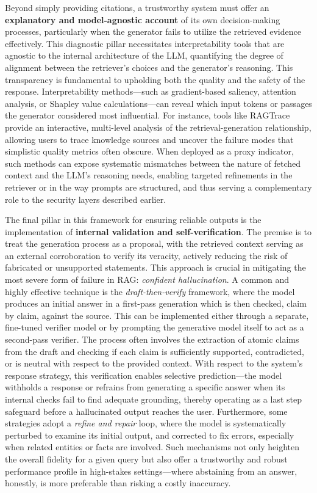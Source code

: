 \documentclass[11pt,a4paper]{article}
\begin{document}
Beyond simply providing citations, a trustworthy system must offer an \textbf{explanatory and model-agnostic account} of its own decision-making processes, particularly when the generator fails to utilize the retrieved evidence effectively. This diagnostic pillar necessitates interpretability tools that are agnostic to the internal architecture of the LLM, quantifying the degree of alignment between the retriever's choices and the generator's reasoning. This transparency is fundamental to upholding both the quality and the safety of the response. Interpretability methods---such as gradient-based saliency, attention analysis, or Shapley value calculations---can reveal which input tokens or passages the generator considered most influential. For instance, tools like RAGTrace \cite{arxiv:2508.06056v1} provide an interactive, multi-level analysis of the retrieval-generation relationship, allowing users to trace knowledge sources and uncover the failure modes that simplistic quality metrics often obscure. When deployed as a proxy indicator, such methods can expose systematic mismatches between the nature of fetched context and the LLM's reasoning needs, enabling targeted refinements in the retriever or in the way prompts are structured, and thus serving a complementary role to the security layers described earlier.

The final pillar in this framework for ensuring reliable outputs is the implementation of \textbf{internal validation and self-verification}. The premise is to treat the generation process as a proposal, with the retrieved context serving as an external corroboration to verify its veracity, actively reducing the risk of fabricated or unsupported statements. This approach is crucial in mitigating the most severe form of failure in RAG: \emph{confident hallucination}. A common and highly effective technique is the \emph{draft-then-verify} framework, where the model produces an initial answer in a first-pass generation which is then checked, claim by claim, against the source. This can be implemented either through a separate, fine-tuned verifier model or by prompting the generative model itself to act as a second-pass verifier. The process often involves the extraction of atomic claims from the draft and checking if each claim is sufficiently supported, contradicted, or is neutral with respect to the provided context. With respect to the system's response strategy, this verification enables selective prediction---the model withholds a response or refrains from generating a specific answer when its internal checks fail to find adequate grounding, thereby operating as a last step safeguard before a hallucinated output reaches the user. Furthermore, some strategies adopt a \emph{refine and repair} loop, where the model is systematically perturbed to examine its initial output, and corrected to fix errors, especially when related entities or facts are involved. Such mechanisms not only heighten the overall fidelity for a given query but also offer a trustworthy and robust performance profile in high-stakes settings---where abstaining from an answer, honestly, is more preferable than risking a costly inaccuracy.
\end{document}
